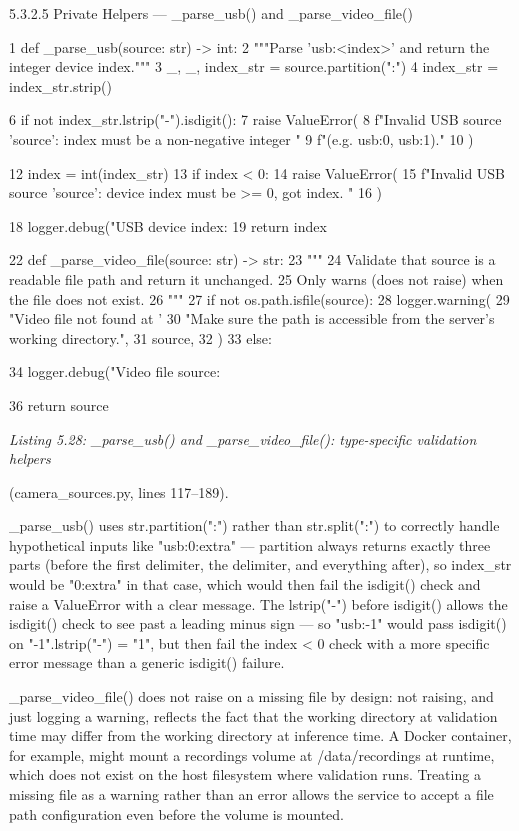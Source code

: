 5.3.2.5 Private Helpers --- \_parse\_usb() and \_parse\_video\_ﬁle()

1 def \_parse\_usb(source: str) -> int:
2 """Parse 'usb:<index>' and return the integer device index."""
3 \_, \_, index\_str = source.partition(":")
4 index\_str = index\_str.strip()


6 if not index\_str.lstrip("-").isdigit():
7 raise ValueError(
8 f"Invalid USB source '{source}': index must be a non-negative integer "
9 f"(e.g. usb:0, usb:1)."
10 )

12 index = int(index\_str)
13 if index < 0:
14 raise ValueError(
15 f"Invalid USB source '{source}': device index must be >= 0, got {index}.
"
16 )


18 logger.debug("USB device index: %
19 return index


22 def \_parse\_video\_file(source: str) -> str:
23 """
24 Validate that source is a readable file path and return it unchanged.
25 Only warns (does not raise) when the file does not exist.
26 """
27 if not os.path.isfile(source):
28 logger.warning(
29 "Video file not found at '%
30 "Make sure the path is accessible from the server's working directory.",
31 source,
32 )
33 else:




34 logger.debug("Video file source: %

36 return source


\textit{Listing 5.28:     \_parse\_usb() and \_parse\_video\_ﬁle():       type-speciﬁc validation helpers}

(camera\_sources.py, lines 117--189).


\_parse\_usb() uses str.partition(":") rather than str.split(":") to correctly
handle hypothetical inputs like "usb:0:extra" --- partition always returns exactly three
parts (before the ﬁrst delimiter, the delimiter, and everything after), so index\_str would be
"0:extra" in that case, which would then fail the isdigit() check and raise a ValueError
with a clear message. The lstrip("-") before isdigit() allows the isdigit() check to
see past a leading minus sign --- so "usb:-1" would pass isdigit() on "-1".lstrip("-")
= "1", but then fail the index < 0 check with a more speciﬁc error message than a generic
isdigit() failure.

\_parse\_video\_file() does not raise on a missing ﬁle by design: not raising, and
just logging a warning, reﬂects the fact that the working directory at validation time may
differ from the working directory at inference time. A Docker container, for example,
might mount a recordings volume at /data/recordings at runtime, which does not exist
on the host ﬁlesystem where validation runs. Treating a missing ﬁle as a warning rather
than an error allows the service to accept a ﬁle path conﬁguration even before the volume
is mounted.



